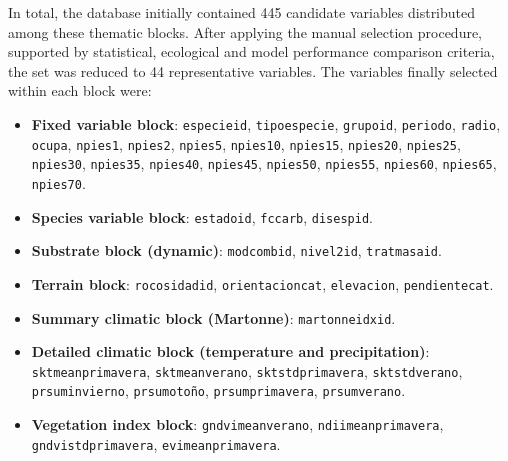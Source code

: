 In total, the database initially contained 445 candidate variables distributed among these thematic blocks. After applying the manual selection procedure, supported by statistical, ecological and model performance comparison criteria, the set was reduced to 44 representative variables. The variables finally selected within each block were:

{%
\renewcommand{\_}{\textunderscore\discretionary{}{}{}}%
\begin{itemize}
    \item \textbf{Fixed variable block}:
          \texttt{especie\_id}, \texttt{tipo\_especie}, \texttt{grupo\_id}, \texttt{periodo}, \texttt{radio}, \texttt{ocupa},
          \texttt{npies\_1}, \texttt{npies\_2}, \texttt{npies\_5},
          \texttt{npies\_10}, \texttt{npies\_15}, \texttt{npies\_20},
          \texttt{npies\_25}, \texttt{npies\_30}, \texttt{npies\_35},
          \texttt{npies\_40}, \texttt{npies\_45}, \texttt{npies\_50},
          \texttt{npies\_55}, \texttt{npies\_60}, \texttt{npies\_65},
          \texttt{npies\_70}.

    \item \textbf{Species variable block}:
          \texttt{estado\_id}, \texttt{fccarb}, \texttt{disesp\_id}.

    \item \textbf{Substrate block (dynamic)}:
          \texttt{modcomb\_id}, \texttt{nivel2\_id},
          \texttt{tratmasa\_id}.

    \item \textbf{Terrain block}:
          \texttt{rocosidad\_id},
          \texttt{orientacion\_cat}, \texttt{elevacion}, \texttt{pendiente\_cat}.

    \item \textbf{Summary climatic block (Martonne)}:
          \texttt{martonneidx\_id}.

    \item \textbf{Detailed climatic block (temperature and precipitation)}:
          \texttt{skt\_mean\_primavera}, \texttt{skt\_mean\_verano},
          \texttt{skt\_std\_primavera}, \texttt{skt\_std\_verano},
          \texttt{pr\_sum\_invierno}, \texttt{pr\_sum\_otoño},
          \texttt{pr\_sum\_primavera}, \texttt{pr\_sum\_verano}.

    \item \textbf{Vegetation index block}:
          \texttt{gndvi\_mean\_verano}, \texttt{ndii\_mean\_primavera},
          \texttt{gndvi\_std\_primavera}, \texttt{evi\_mean\_primavera}.
\end{itemize}
}%

